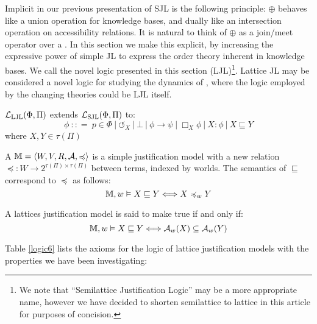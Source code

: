 Implicit in our previous presentation of SJL is the following
principle: 
 $\oplus$ behaves like a union
operation for knowledge bases, and dually like an intersection operation on
accessibility relations.  It is natural to think of $\oplus$ as a join/meet
operator over a {}.  In this section we make this
explicit, by increasing the expressive power of simple JL to express the order
theory inherent in knowledge bases.  We call the novel logic presented in
this section  (LJL){\footnote{We note
that ``Semilattice Justification Logic'' may be a more appropriate name,
however we have decided to shorten semilattice to lattice in this article
for purposes of concision.}}.  Lattice JL may be considered a novel logic for
studying the dynamics of , where the logic employed by
the changing theories could be LJL itself.



\begin{definition}
  $\mathcal{L}_{\tmop{LJL}} (\Phi, \Pi)$ extends $\mathcal{L}_{\tmop{SJL}}
  (\Phi, \Pi)$ to:
  \[ \phi \  : : = \  p \in \Phi \  |
     \  \circlearrowleft_X \  | \  \bot
     \  | \  \phi \rightarrow \psi \  |
     \  \Box_X \phi \  | \  X : \phi
     \  | \  X \sqsubseteq Y \]
  where $X, Y \in \tau (\Pi)$
\end{definition}

\begin{definition}
  \label{latmodels}A {} $\mathbbm{M}=
  \langle W, V, R, \mathcal{A}, \preccurlyeq \rangle$ is a simple
  justification model with a new relation $\preccurlyeq : W \rightarrow
  2^{\tau (\Pi) \times \tau (\Pi)}$ between terms, indexed by worlds.  The
  semantics of $\sqsubseteq$ correspond to $\preccurlyeq$ as follows:
  \[ \mathbbm{M}, w \vDash X \sqsubseteq Y \Longleftrightarrow X
     \preccurlyeq_w Y \]
\end{definition}

\begin{definition}
  A lattices justification model is said to make true  if
  and only if:
  \[ \mathbbm{M}, w \vDash X \sqsubseteq Y \Longleftrightarrow \mathcal{A}_w
     (X) \subseteq \mathcal{A}_w (Y) \]
\end{definition}

Table \ref{logic6} lists the axioms for the logic of lattice justification
models with the properties we have been investigating:

